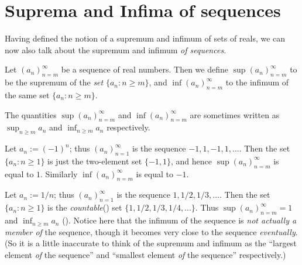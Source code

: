 \section{Suprema and Infima of sequences} \label{sec 6.3}

Having defined the notion of a supremum and infimum of sets of reals, we can now also talk about the supremum and infimum \emph{of sequences}.

\begin{definition}  \label{def 6.3.1}
Let \((a_n)_{n = m}^{\infty}\) be a sequence of real numbers.
Then we define \(\sup(a_n)_{n = m}^{\infty}\) to be the supremum of the \emph{set} \(\{a_n : n \ge m\}\), and \(\inf(a_n)_{n = m}^{\infty}\) to the infimum of the same set \(\{a_n : n \ge m\}\).
\end{definition}

\begin{remark} \label{remark 6.3.2}
The quantities \(\sup(a_n)_{n = m}^{\infty}\) and \(\inf(a_n)_{n = m}^{\infty}\) are sometimes written as \(\sup_{n \ge m} a_n\) and \(\inf_{n \ge m} a_n\) respectively.
\end{remark}

\begin{example} \label{example 6.3.3}
Let \(a_n := (-1)^n\); thus \((a_n)_{n=1}^{\infty}\) is the sequence
\(-1, 1, -1, 1,...\).
Then the set \(\{a_n : n \ge 1\}\) is just the two-element set \(\{-1, 1\}\), and hence \(\sup(a_n)_{n = m}^{\infty}\) is equal to \(1\).
Similarly \(\inf(a_n)_{n = m}^{\infty}\) is equal to \(-1\).
\end{example}

\begin{example} \label{example 6.3.4}
Let \(a_n := 1/n\); thus \((a_n)_{n = 1}^{\infty}\) is the sequence \(1, 1/2, 1/3,...\).
Then the set \(\{a_n : n \ge 1\}\) is the \emph{countable}() set \(\{1, 1/2, 1/3, 1/4,...\}\).
Thus \(\sup(a_n)_{n = m}^{\infty} = 1\) and \(\inf_{n \ge m} a_n\) ().
Notice here that the infimum of the sequence is \emph{not actually a member of} the sequence, though it becomes very close to the sequence \emph{eventually}.
(So it is a little inaccurate to think of the supremum and infimum as the ``largest element \emph{of} the sequence'' and ``smallest element \emph{of} the sequence'' respectively.)
\end{example}

